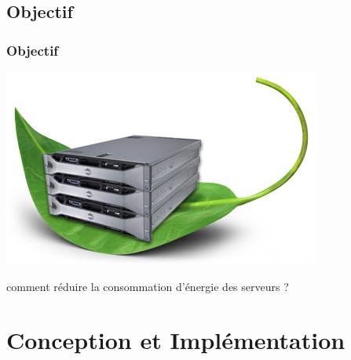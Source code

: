 \documentclass[xcolor=dvipsnames]{beamer}
\begin{document}
\begin{frame}
\begin{columns}
\begin{column}{0.25\textwidth}
\end{column}

\end{columns}

\end{frame}



\subsection{Objectif}

\begin{frame}
\frametitle{Objectif}

\begin{center}
\includegraphics[scale=0.5]{green-server.jpg}
\end{center}
\begin{block}{}
\begin{center}
comment réduire la consommation d'énergie des serveurs ?
\end{center}
\end{block}

\end{frame}



\section{Conception et Implémentation}
\end{document}

